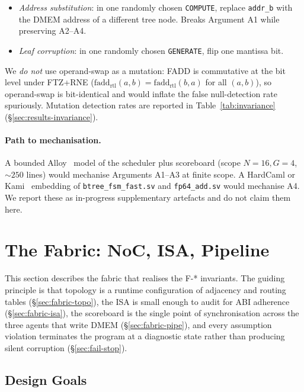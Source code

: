 \documentclass[journal,10pt]{IEEEtran}
\theoremstyle{plain}
\theoremstyle{definition}
\theoremstyle{remark}
\newcommand{\fadd}{\ensuremath{\mathrm{fadd}_{\mathrm{rtl}}}}
\newcommand{\sv}[1]{\texttt{#1}}
\begin{document}
\begin{itemize}
\item \emph{Address substitution}: in one randomly chosen
  \texttt{COMPUTE}, replace \texttt{addr\_b} with the DMEM address of a
  different tree node. Breaks Argument A1 while preserving A2--A4.
\item \emph{Leaf corruption}: in one randomly chosen \texttt{GENERATE},
  flip one mantissa bit.
\end{itemize}
We \emph{do not} use operand-swap as a mutation: FADD is commutative at
the bit level under FTZ+RNE ($\fadd(a,b) = \fadd(b,a)$ for all $(a,b)$),
so operand-swap is bit-identical and would inflate the false null-detection
rate spuriously. Mutation detection rates are reported in
Table~\ref{tab:invariance} (\S\ref{sec:results-invariance}).

\paragraph{Path to mechanisation.} A bounded Alloy~\cite{jackson2012alloy}
model of the scheduler plus scoreboard (scope $N=16, G=4$,
${\sim}250$ lines) would mechanise Arguments A1--A3 at finite scope. A
HardCaml or Kami~\cite{choi2017kami} embedding of
\sv{btree\_fsm\_fast.sv} and \sv{fp64\_add.sv} would mechanise A4. We
report these as in-progress supplementary artefacts and do not claim
them here.


\section{The Fabric: NoC, ISA, Pipeline}\label{sec:fabric}

This section describes the fabric that realises the \textsf{F-*}
invariants. The guiding principle is that topology is a runtime
configuration of adjacency and routing tables (\S\ref{sec:fabric-topo}),
the ISA is small enough to audit for ABI adherence
(\S\ref{sec:fabric-isa}), the scoreboard is the single point of
synchronisation across the three agents that write DMEM
(\S\ref{sec:fabric-pipe}), and every assumption violation terminates
the program at a diagnostic state rather than producing silent corruption
(\S\ref{sec:fail-stop}).

\subsection{Design Goals}
\end{document}
